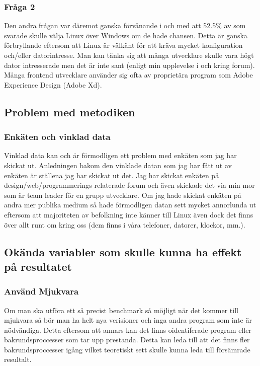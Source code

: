 \documentclass[12pt, a4paper]{report}
\begin{document}
\subsubsection{Fråga 2}
Den andra frågan var däremot ganska förvånande i och med att 52.5\% av som svarade skulle välja Linux över Windows om de hade chansen. Detta är ganska förbryllande eftersom att Linux är välkänt för att kräva mycket konfiguration och/eller datorintresse. Man kan tänka sig att många utvecklare skulle vara högt dator intresserade men det är inte sant (enligt min upplevelse i och kring forum). Många frontend utvecklare använder sig ofta av proprietära program som Adobe Experience Design (Adobe Xd). 

\subsection{Problem med metodiken}

\subsubsection{Enkäten och vinklad data}

Vinklad data kan och är förmodligen ett problem med enkäten som jag har skickat ut. Anledningen bakom den vinklade datan som jag har fått ut av enkäten är ställena jag har skickat ut det. Jag har skickat enkäten på design/web/programmerings relaterade forum och även skickade det via min mor som är team leader för en grupp utvecklare. Om jag hade skickat enkäten på andra mer publika medium så hade förmodligen datan sett mycket annorlunda ut eftersom att majoriteten av befolkning inte känner till Linux även dock det finns över allt runt om kring oss (dem finns i våra telefoner, datorer, klockor, mm.). 

\subsection{Okända variabler som skulle kunna ha effekt på resultatet}


\subsubsection{Använd Mjukvara}

Om man ska utföra ett så precist benchmark så möjligt när det kommer till mjukvara så bör man ha helt nya verisioner och inga andra program som inte är nödvändiga. Detta eftersom att annars kan det finns oidentiferade program eller bakrundsproccesser som tar upp prestanda. Detta kan leda till att det finns fler bakrundsproccesser igång vilket teoretiskt sett skulle kunna leda till försämrade resultalt.
\end{document}
